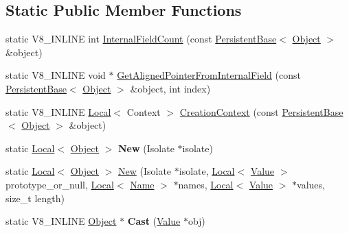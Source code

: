 \subsection*{Static Public Member Functions}
\begin{DoxyCompactItemize}
\item 
static V8\+\_\+\+I\+N\+L\+I\+NE int \mbox{\hyperlink{classv8_1_1Object_a324a71142f621a32bfe5738648718370}{Internal\+Field\+Count}} (const \mbox{\hyperlink{classv8_1_1PersistentBase}{Persistent\+Base}}$<$ \mbox{\hyperlink{classv8_1_1Object}{Object}} $>$ \&object)
\item 
static V8\+\_\+\+I\+N\+L\+I\+NE void $\ast$ \mbox{\hyperlink{classv8_1_1Object_a65b5a3dc93c0774594f8b0f2ab5481c8}{Get\+Aligned\+Pointer\+From\+Internal\+Field}} (const \mbox{\hyperlink{classv8_1_1PersistentBase}{Persistent\+Base}}$<$ \mbox{\hyperlink{classv8_1_1Object}{Object}} $>$ \&object, int index)
\item 
static V8\+\_\+\+I\+N\+L\+I\+NE \mbox{\hyperlink{classv8_1_1Local}{Local}}$<$ Context $>$ \mbox{\hyperlink{classv8_1_1Object_ae958203f358c7af3727ef7179790d01f}{Creation\+Context}} (const \mbox{\hyperlink{classv8_1_1PersistentBase}{Persistent\+Base}}$<$ \mbox{\hyperlink{classv8_1_1Object}{Object}} $>$ \&object)
\item 
\mbox{\label{classv8_1_1Object_a0c397b055e2f5050c6ffc33970669c4d}} 
static \mbox{\hyperlink{classv8_1_1Local}{Local}}$<$ \mbox{\hyperlink{classv8_1_1Object}{Object}} $>$ {\bfseries New} (Isolate $\ast$isolate)
\item 
static \mbox{\hyperlink{classv8_1_1Local}{Local}}$<$ \mbox{\hyperlink{classv8_1_1Object}{Object}} $>$ \mbox{\hyperlink{classv8_1_1Object_a91733478a00a8d80d109531d2f741569}{New}} (Isolate $\ast$isolate, \mbox{\hyperlink{classv8_1_1Local}{Local}}$<$ \mbox{\hyperlink{classv8_1_1Value}{Value}} $>$ prototype\+\_\+or\+\_\+null, \mbox{\hyperlink{classv8_1_1Local}{Local}}$<$ \mbox{\hyperlink{classv8_1_1Name}{Name}} $>$ $\ast$names, \mbox{\hyperlink{classv8_1_1Local}{Local}}$<$ \mbox{\hyperlink{classv8_1_1Value}{Value}} $>$ $\ast$values, size\+\_\+t length)
\item 
\mbox{\label{classv8_1_1Object_a1f9ac46d0b164197318ce81dc0ec1343}} 
static V8\+\_\+\+I\+N\+L\+I\+NE \mbox{\hyperlink{classv8_1_1Object}{Object}} $\ast$ {\bfseries Cast} (\mbox{\hyperlink{classv8_1_1Value}{Value}} $\ast$obj)
\end{DoxyCompactItemize}



